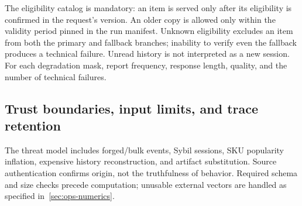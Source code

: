 \documentclass[12pt,a4paper]{article}
\theoremstyle{plainru}
\begin{document}
The eligibility catalog is mandatory: an item is served only
after its eligibility is confirmed in the request's version. An older copy
is allowed only within the validity period pinned in the
run manifest. Unknown eligibility excludes an item from both the primary and
fallback branches; inability to verify even the fallback produces
a technical failure. Unread history is not interpreted as a new session.
For each degradation mask, report frequency, response length,
quality, and the number of technical failures.

\subsection{Trust boundaries, input limits, and trace retention}
\label{sec:ops-security}

The threat model includes forged/bulk events, Sybil sessions,
SKU popularity inflation, expensive history reconstruction, and artifact substitution.
Source authentication confirms origin, not the truthfulness
of behavior. Required schema and size checks precede computation;
unusable external vectors are handled as specified in~\ref{sec:ops-numerics}.
\end{document}
